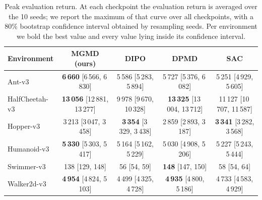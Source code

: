 \begin{table}[t]
\centering
\caption{Peak evaluation return. At each checkpoint the evaluation return is averaged over the 10 seeds; we report the maximum of that curve over all checkpoints, with a 80\% bootstrap confidence interval obtained by resampling seeds. Per environment we bold the best value and every value lying inside its confidence interval.}
\label{tab:max_eval_return}
\begin{tabular}{lcccc}
\toprule
Environment & MGMD (ours) & DIPO & DPMD & SAC \\
\midrule
Ant-v3 & \textbf{6\,660} {\scriptsize [6\,566, 6\,830]} & 5\,586 {\scriptsize [5\,283, 5\,894]} & 5\,727 {\scriptsize [5\,376, 6\,082]} & 5\,251 {\scriptsize [4\,929, 5\,605]} \\
HalfCheetah-v3 & \textbf{13\,056} {\scriptsize [12\,881, 13\,277]} & 9\,978 {\scriptsize [9\,670, 10\,328]} & \textbf{13\,325} {\scriptsize [13\,004, 13\,712]} & 11\,127 {\scriptsize [10\,707, 11\,587]} \\
Hopper-v3 & 3\,213 {\scriptsize [3\,047, 3\,458]} & \textbf{3\,354} {\scriptsize [3\,329, 3\,438]} & 2\,859 {\scriptsize [2\,893, 3\,187]} & \textbf{3\,341} {\scriptsize [3\,282, 3\,568]} \\
Humanoid-v3 & \textbf{5\,330} {\scriptsize [5\,303, 5\,417]} & 5\,164 {\scriptsize [5\,162, 5\,229]} & 5\,030 {\scriptsize [4\,908, 5\,206]} & 5\,227 {\scriptsize [5\,243, 5\,444]} \\
Swimmer-v3 & 138 {\scriptsize [129, 148]} & 56 {\scriptsize [54, 59]} & \textbf{148} {\scriptsize [147, 150]} & 58 {\scriptsize [54, 64]} \\
Walker2d-v3 & \textbf{4\,954} {\scriptsize [4\,824, 5\,103]} & 4\,499 {\scriptsize [4\,325, 4\,728]} & \textbf{4\,935} {\scriptsize [4\,800, 5\,186]} & 4\,733 {\scriptsize [4\,583, 4\,929]} \\
\bottomrule
\end{tabular}
\end{table}
